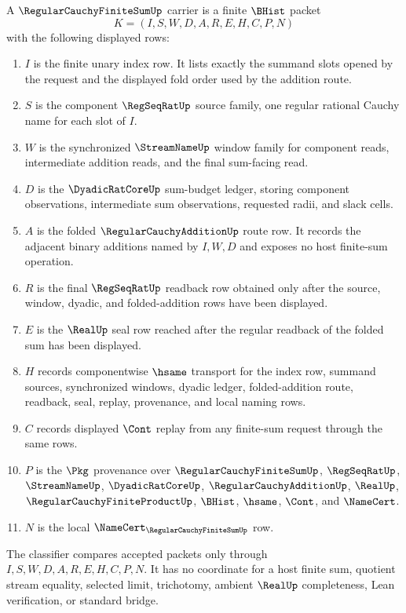 \begin{definition}\label{def:regular-cauchy-finite-sum-carrier}
A $\RegularCauchyFiniteSumUp$ carrier is a finite $\BHist$ packet
$$
K=(I,S,W,D,A,R,E,H,C,P,N)
$$
with the following displayed rows:
\begin{enumerate}
\item $I$ is the finite unary index row. It lists exactly the summand slots opened by the request and the displayed fold order used by the addition route.
\item $S$ is the component $\RegSeqRatUp$ source family, one regular rational Cauchy name for each slot of $I$.
\item $W$ is the synchronized $\StreamNameUp$ window family for component reads, intermediate addition reads, and the final sum-facing read.
\item $D$ is the $\DyadicRatCoreUp$ sum-budget ledger, storing component observations, intermediate sum observations, requested radii, and slack cells.
\item $A$ is the folded $\RegularCauchyAdditionUp$ route row. It records the adjacent binary additions named by $I,W,D$ and exposes no host finite-sum operation.
\item $R$ is the final $\RegSeqRatUp$ readback row obtained only after the source, window, dyadic, and folded-addition rows have been displayed.
\item $E$ is the $\RealUp$ seal row reached after the regular readback of the folded sum has been displayed.
\item $H$ records componentwise $\hsame$ transport for the index row, summand sources, synchronized windows, dyadic ledger, folded-addition route, readback, seal, replay, provenance, and local naming rows.
\item $C$ records displayed $\Cont$ replay from any finite-sum request through the same rows.
\item $P$ is the $\Pkg$ provenance over $\RegularCauchyFiniteSumUp$, $\RegSeqRatUp$, $\StreamNameUp$, $\DyadicRatCoreUp$, $\RegularCauchyAdditionUp$, $\RealUp$, $\RegularCauchyFiniteProductUp$, $\BHist$, $\hsame$, $\Cont$, and $\NameCert$.
\item $N$ is the local $\NameCert_{\RegularCauchyFiniteSumUp}$ row.
\end{enumerate}
The classifier compares accepted packets only through $I,S,W,D,A,R,E,H,C,P,N$. It has no coordinate for a host finite sum, quotient stream equality, selected limit, trichotomy, ambient $\RealUp$ completeness, Lean verification, or standard bridge.
\end{definition}

